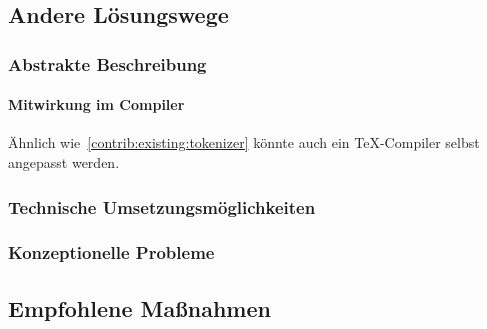 \subsection{Andere Lösungswege}
\subsubsection{Abstrakte Beschreibung}%
\paragraph*{Mitwirkung im Compiler}
Ähnlich wie~\ref{contrib:existing:tokenizer} könnte auch ein \TeX{}-Compiler selbst angepasst werden.
\subsubsection{Technische Umsetzungsmöglichkeiten}
\subsubsection{Konzeptionelle Probleme}
\subsection{Empfohlene Maßnahmen}%